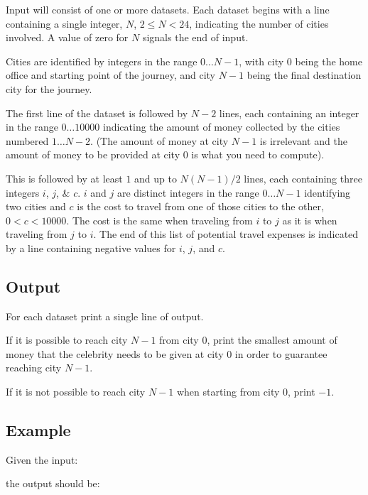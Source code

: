 Input will consist of one or more datasets. Each dataset begins with a
line containing a single integer, $N$, $2 \leq N < 24$, indicating the
number of cities involved. A value of zero for $N$ signals the end of
input.

Cities are identified by integers in the range $0\ldots N-1$, with
city $0$ being the home office and starting point of the journey, and
city $N-1$ being the final destination city for the journey.

The first line of the dataset is followed by $N-2$ lines, each
containing an integer in the range $0\ldots \num{10000}$ indicating the
amount of money collected by the cities numbered $1 \ldots N-2$. (The
amount of money at city $N-1$ is irrelevant and the amount of money to
be provided at city $0$ is what you need to compute).

This is followed by at least $1$ and up to $N(N-1)/2$ lines, each
containing three integers $i$, $j$, \& $c$.  $i$ and $j$ are distinct
integers in the range $0\ldots N-1$ identifying two cities and $c$ is
the cost to travel from one of those cities to the other, $0 < c <
\num{10000}$. The cost is the same when traveling from $i$ to $j$ as it is
when traveling from $j$ to $i$.  The end of this list of potential travel
expenses is indicated by a line containing negative values for $i$,
$j$, and $c$.


\subsection*{Output}

For each dataset print a single line of output. 

If it is possible to reach city $N-1$ from city $0$, print the
smallest amount of money that the celebrity needs to be given at city
$0$ in order to guarantee reaching city $N-1$.

If it is not possible to reach city $N-1$ when starting from city $0$, print $-1$.



\subsection*{Example}

Given the input:



the output should be:




